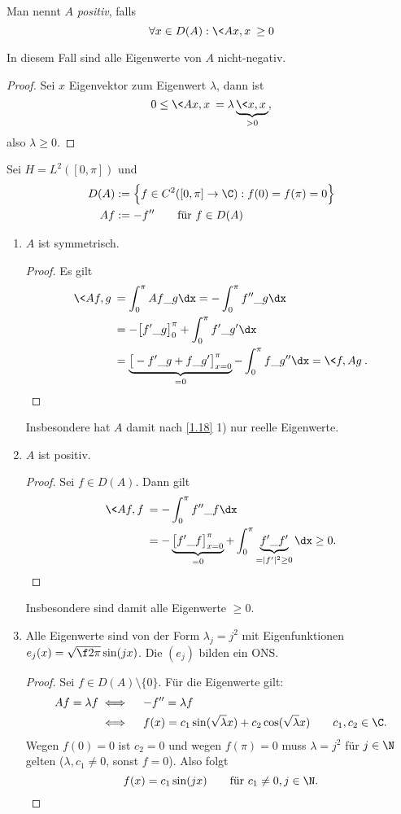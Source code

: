 \begin{df*}
	Man nennt $A$ \emph{positiv}, falls
	\[
		\forall x \in D(A) : \<Ax,x\> \ge 0
	\]
	\begin{note}
		In diesem Fall sind alle Eigenwerte von $A$ nicht-negativ.
		\begin{proof}
			Sei $x$ Eigenvektor zum Eigenwert $\lambda$, dann ist
			\[
				0 \le \<Ax,x\> 
				= \lambda \underbrace{\<x,x\>}_{>0},
			\]
			also $\lambda \ge 0$.
		\end{proof}
	\end{note}
\end{df*}

\begin{ex} \label{1.21}
	Sei $H = L^2([0,\pi])$ und
	\begin{align*}
		D(A) &:= \Big\{ f \in C^2 ([0,\pi] \to \C) : f(0) = f(\pi) = 0 \Big\} \\
		Af &:= -f'' \qquad \text{für } f \in D(A)
	\end{align*}
	\begin{enumerate}[1)]
		\item
			$A$ ist symmetrisch.
			\begin{proof}
			Es gilt
				\begin{align*}
					\<Af, g\> 
					&= \int_0^{\pi} Af \_g \dx
					= - \int_0^{\pi} f'' \_g \dx \\
					&= -\big[ f'\_{g} \big]_{0}^\pi + \int_{0}^\pi f'\_{g'} \dx \\
					&= \underbrace{\big[ - f'\_g + f \_g' \big]_{x=0}^\pi}_{=0} - \int_0^\pi f \_g'' \dx 
					= \<f, Ag\>.
				\end{align*}
			\end{proof}
			Insbesondere hat $A$ damit nach \ref{1.18} 1) nur reelle Eigenwerte.
		\item
			$A$ ist positiv.
			\begin{proof}
				Sei $f \in D(A)$.
				Dann gilt
				\begin{align*}
					\<Af,f\> 
					&= - \int_0^\pi f'' \_f \dx \\
					&= - \underbrace{\big[f' \_f \big]_{x=0}^\pi}_{=0} + \int_0^\pi \underbrace{f' \_f'}_{= |f'|^2 \ge 0} \dx
					\ge 0.
				\end{align*}
			\end{proof}
			Insbesondere sind damit alle Eigenwerte $\ge 0$.
		\item
			Alle Eigenwerte sind von der Form $\lambda_j = j^2$ mit Eigenfunktionen $e_j(x) = \sqrt{\f 2 \pi} \sin (jx)$.
			Die $(e_j)$ bilden ein ONS.
			\begin{proof}
				Sei $f \in D(A) \setminus \{0\}$.
				Für die Eigenwerte gilt:
				\begin{align*}
					Af = \lambda f
					&\iff\quad -f'' = \lambda f \\
					&\iff\quad f(x) = c_1 \sin(\sqrt \lambda x) + c_2 \cos (\sqrt \lambda x) \qquad c_1,c_2 \in \C.
				\end{align*}
				Wegen $f(0)=0$ ist $c_2 = 0$ und wegen $f(\pi) = 0$ muss $\lambda = j^2$ für $j\in \N$ gelten ($\lambda, c_1 \neq 0$, sonst $f = 0$).
				Also folgt
				\[
					f(x) = c_1 \sin(j x) \qquad  \text{für $c_1 \neq 0, j \in \N$.}
				\]


\end{proof}
\end{enumerate}
\end{ex}
